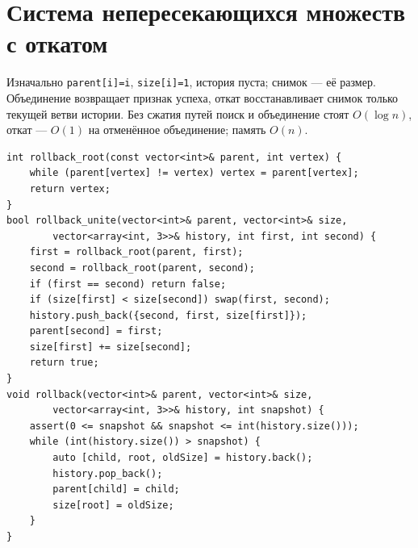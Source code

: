 \section{Система непересекающихся множеств с откатом}
Изначально \texttt{parent[i]=i}, \texttt{size[i]=1}, история пуста; снимок --- её размер.
Объединение возвращает признак успеха, откат восстанавливает снимок только текущей ветви истории.
Без сжатия путей поиск и объединение стоят $O(\log n)$, откат --- $O(1)$ на отменённое объединение; память $O(n)$.
\begin{lstlisting}[name=rollback_dsu]
int rollback_root(const vector<int>& parent, int vertex) {
    while (parent[vertex] != vertex) vertex = parent[vertex];
    return vertex;
}
bool rollback_unite(vector<int>& parent, vector<int>& size,
        vector<array<int, 3>>& history, int first, int second) {
    first = rollback_root(parent, first);
    second = rollback_root(parent, second);
    if (first == second) return false;
    if (size[first] < size[second]) swap(first, second);
    history.push_back({second, first, size[first]});
    parent[second] = first;
    size[first] += size[second];
    return true;
}
void rollback(vector<int>& parent, vector<int>& size,
        vector<array<int, 3>>& history, int snapshot) {
    assert(0 <= snapshot && snapshot <= int(history.size()));
    while (int(history.size()) > snapshot) {
        auto [child, root, oldSize] = history.back();
        history.pop_back();
        parent[child] = child;
        size[root] = oldSize;
    }
}
\end{lstlisting}
%

